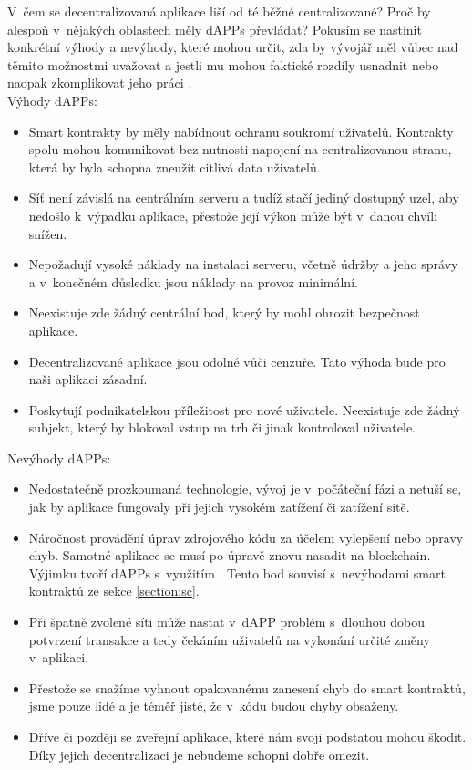 V~čem se decentralizovaná aplikace liší od té běžné centralizované? Proč by alespoň v~nějakých oblastech měly dAPPs převládat? Pokusím se nastínit konkrétní výhody a nevýhody, které mohou určit, zda by vývojář měl vůbec nad těmito možnostmi uvažovat a jestli mu mohou faktické rozdíly usnadnit nebo naopak zkomplikovat jeho práci \cite{dappProsCons}. \\
Výhody dAPPs:

\begin{itemize}
\item Smart kontrakty by měly nabídnout ochranu soukromí uživatelů. Kontrakty spolu mohou komunikovat bez nutnosti napojení na centralizovanou stranu, která by byla schopna zneužít citlivá data uživatelů.
\item Síť není závislá na centrálním serveru a tudíž stačí jediný dostupný uzel, aby nedošlo k~výpadku aplikace, přestože její výkon může být v~danou chvíli snížen.

\item Nepožadují vysoké náklady na instalaci serveru, včetně údržby a jeho správy a v~konečném důsledku jsou náklady na provoz minimální.

\item Neexistuje zde žádný centrální bod, který by mohl ohrozit bezpečnost aplikace. 

\item Decentralizované aplikace jsou odolné vůči cenzuře. Tato výhoda bude pro naši aplikaci zásadní.

\item Poskytují podnikatelskou příležitost pro nové uživatele. Neexistuje zde žádný subjekt, který by blokoval vstup na trh či jinak kontroloval uživatele.
 \end{itemize}

Nevýhody dAPPs:
\begin{itemize}
\item Nedostatečně prozkoumaná technologie, vývoj je v~počáteční fázi a netuší se, jak by aplikace fungovaly při jejich vysokém zatížení či zatížení sítě.
\item Náročnost provádění úprav zdrojového kódu za účelem vylepšení nebo opravy chyb. Samotné aplikace se musí po úpravě znovu nasadit na blockchain. Výjimku tvoří dAPPs s~využitím . Tento bod souvisí s~nevýhodami smart kontraktů ze sekce \ref{section:sc}.
\item Při špatně zvolené síti může nastat v~dAPP problém s~dlouhou dobou potvrzení transakce a tedy čekáním uživatelů na vykonání určité změny v~aplikaci.
\item Přestože se snažíme vyhnout opakovanému zanesení chyb do smart kontraktů, jsme pouze lidé a je téměř jisté, že v~kódu budou chyby obsaženy.
\item Dříve či později se zveřejní aplikace, které nám svoji podstatou mohou škodit. Díky jejich decentralizaci je nebudeme schopni dobře omezit.
\end{itemize}

